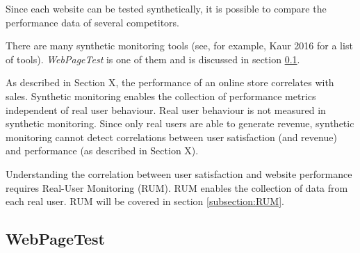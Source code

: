 Since each website can be tested synthetically, it is possible to compare the performance data of several competitors. %



There are many synthetic monitoring tools (see, for example, Kaur 2016 for a list of tools). %
\textit{WebPageTest} is one of them and is discussed in section \ref{subsection:webpagetest}.



As described in Section X, the performance of an online store correlates with sales.
Synthetic monitoring enables the collection of performance metrics independent of real user behaviour.
Real user behaviour is not measured in synthetic monitoring.
Since only real users are able to generate revenue, synthetic monitoring cannot detect correlations between user satisfaction (and revenue) and performance (as described in Section X).%

Understanding the correlation between user satisfaction and website performance requires Real-User Monitoring (RUM).
RUM enables the collection of data from each real user.
RUM will be covered in section \ref{subsection:RUM}.








\subsection{WebPageTest}
\label{subsection:webpagetest}


